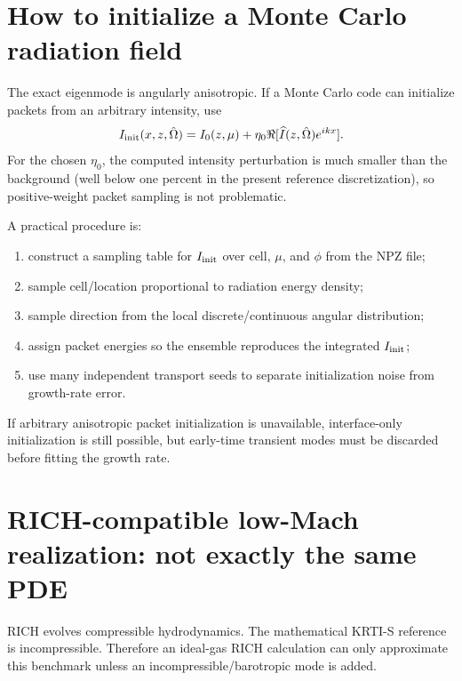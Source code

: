 \documentclass[11pt]{article}
\newcommand{\Oh}{\hat{\Omega}}
\newcommand{\Ihat}{\widehat I}
\begin{document}
\section{How to initialize a Monte Carlo radiation field}
The exact eigenmode is angularly anisotropic. If a Monte Carlo code can initialize packets from an arbitrary intensity, use
\begin{equation}
I_{\rm init}(x,z,\Oh)=I_0(z,\mu)+\eta_0\Re[\Ihat(z,\Oh)e^{ikx}].
\end{equation}
For the chosen $\eta_0$, the computed intensity perturbation is much smaller than the background (well below one percent in the present reference discretization), so positive-weight packet sampling is not problematic.

A practical procedure is:
\begin{enumerate}[leftmargin=2em]
\item construct a sampling table for $I_{\rm init}$ over cell, $\mu$, and $\phi$ from the NPZ file;
\item sample cell/location proportional to radiation energy density;
\item sample direction from the local discrete/continuous angular distribution;
\item assign packet energies so the ensemble reproduces the integrated $I_{\rm init}$;
\item use many independent transport seeds to separate initialization noise from growth-rate error.
\end{enumerate}

If arbitrary anisotropic packet initialization is unavailable, interface-only initialization is still possible, but early-time transient modes must be discarded before fitting the growth rate.

\section{RICH-compatible low-Mach realization: not exactly the same PDE}
RICH evolves compressible hydrodynamics. The mathematical KRTI-S reference is incompressible. Therefore an ideal-gas RICH calculation can only approximate this benchmark unless an incompressible/barotropic mode is added.
\end{document}

